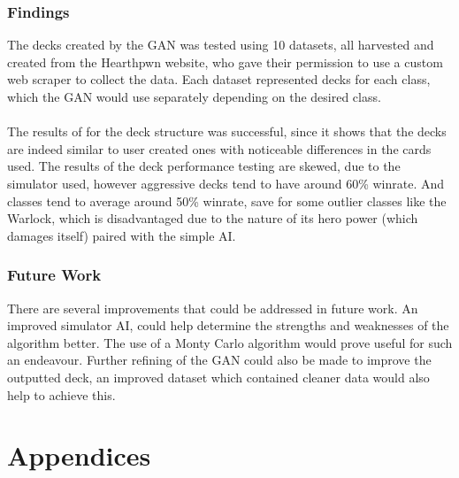 \documentclass{report} %
\begin{document}
\subsection{Findings}
The decks created by the GAN was tested using 10 datasets, all harvested and created from the Hearthpwn website, who gave their permission to use a custom web scraper to collect the data. Each dataset represented decks for each class, which the GAN would use separately depending on the desired class. \\
\\
The results of for the deck structure was successful, since it shows that the decks are indeed similar to user created ones with noticeable differences in the cards used. The results of the deck performance testing are skewed, due to the simulator used, however aggressive decks tend to have around 60\% winrate. And classes tend to average around 50\% winrate, save for some outlier classes like the Warlock, which is disadvantaged due to the nature of its hero power (which damages itself) paired with the simple AI.
\subsection{Future Work}
There are several improvements that could be addressed in future work. An improved simulator AI, could help determine the strengths and weaknesses of the algorithm better. The use of a Monty Carlo algorithm would prove useful for such an endeavour. Further refining of the GAN could also be made to improve the outputted deck, an improved dataset which contained cleaner data would also help to achieve this.



\chapter{Appendices}
\end{document}
